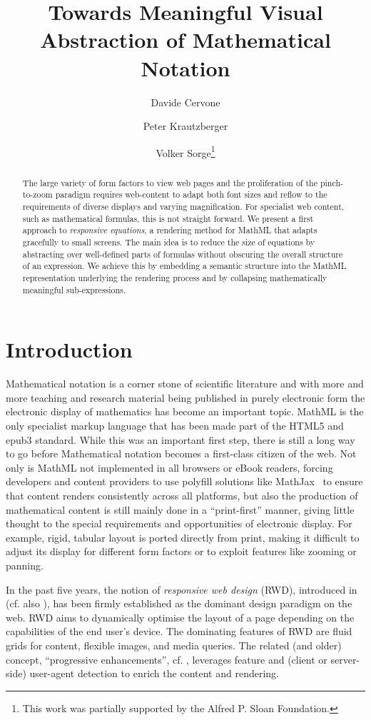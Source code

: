 \documentclass{llncs}
\title{Towards Meaningful Visual Abstraction of Mathematical Notation}
\author{Davide Cervone \and Peter Krautzberger \and Volker Sorge\thanks{This
    work was partially supported by the Alfred P. Sloan Foundation.}}
\institute{MathJax Consortium\\
  \email{dpvc@union.edu, peter.krautzberger@mathjax.org, V.Sorge@cs.bham.ac.uk}
}
\begin{document}
\maketitle
\begin{abstract}
  The large variety of form factors to view web pages and the proliferation of
  the pinch-to-zoom paradigm requires web-content to adapt both font sizes and
  reflow to the requirements of diverse displays and varying magnification. For
  specialist web content, such as mathematical formulas, this is not straight
  forward.  We present a first approach to \emph{responsive equations}, a rendering
  method for MathML that adapts gracefully to small screens. The main idea is to
  reduce the size of equations by abstracting over well-defined parts of formulas
  without obscuring the overall structure of an expression.  We achieve this by
  embedding a semantic structure into the MathML representation underlying the
  rendering process and by collapsing mathematically meaningful sub-expressions.
\end{abstract}

\section{Introduction}
\label{sec:introduction}

Mathematical notation is a corner stone of scientific literature and with more
and more teaching and research material being published in purely electronic
form the electronic display of mathematics has become an important topic.
MathML is the only specialist markup language that has been made part of the
HTML5 and epub3 standard. While this was an important first step, there is still
a long way to go before Mathematical notation becomes a first-class citizen of
the web. Not only is MathML not implemented in all browsers or eBook readers,
forcing developers and content providers to use polyfill solutions like
MathJax~\cite{mathjax} to ensure that content renders consistently across all
platforms, but also the production of mathematical content is still mainly done
in a ``print-first'' manner, giving little thought to the special requirements and
opportunities of electronic display. For example, rigid, tabular layout is
ported directly from print, making it difficult to adjust its display for
different form factors or to exploit features like zooming or panning.

In the past five years, the notion of \emph{responsive web design} (RWD),
introduced in \cite{alistapart} (cf. also \cite{wikiRwd}), has been firmly
established as the dominant design paradigm on the web. RWD aims to dynamically
optimise the layout of a page depending on the capabilities of the end user's
device. The dominating features of RWD are fluid grids for content, flexible
images, and media queries. The related (and older) concept, ``progressive
enhancements'', cf. \cite{progEnh}, leverages feature and (client or
server-side) user-agent detection to enrich the content and rendering.
\end{document}
